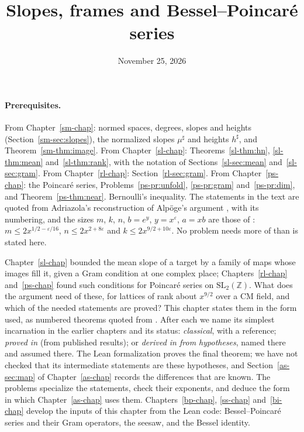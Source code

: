 \documentclass[reqno]{amsart}
\title{Slopes, frames and Bessel--Poincar\'e series}
\author{}
\date{November 25, 2026}
\newcounter{chap}
\theoremstyle{definition}
\theoremstyle{plain}
\newcommand{\Z}{\mathbb{Z}}
\begin{document}
\maketitle
{}\label{chap}

\paragraph{Prerequisites.}
From Chapter~\ref{sm-chap}: normed spaces, degrees, slopes and heights (Section~\ref{sm-sec:slopes}), the normalized slopes \(\mu^\sharp\) and heights \(h^\sharp\), and Theorem~\ref{sm-thm:image}.  From Chapter~\ref{sl-chap}: Theorems~\ref{sl-thm:hn}, \ref{sl-thm:mean} and~\ref{sl-thm:rank}, with the notation of Sections~\ref{sl-sec:mean} and~\ref{sl-sec:gram}.  From Chapter~\ref{rl-chap}: Section~\ref{rl-sec:gram}.  From Chapter~\ref{ps-chap}: the Poincar\'e series, Problems~\ref{ps-pr:unfold}, \ref{ps-pr:gram} and~\ref{ps-pr:dim}, and Theorem~\ref{ps-thm:near}.  Bernoulli's inequality.  The statements in the text are quoted from Adriazola's reconstruction \cite{Adr} of Alp\"oge's argument \cite{Alp}, with its numbering, and the sizes \(m\), \(k\), \(n\), \(b = e^y\), \(y = x^\varepsilon\), \(a = xb\) are those of \cite[Prop.~5.15]{Adr}: \(m \le 2x^{1/2-\varepsilon/16}\), \(n \le 2x^{2+8\varepsilon}\) and \(k \le 2x^{9/2+10\varepsilon}\).  No problem needs more of \cite{Adr} than is stated here.

\medskip
Chapter~\ref{sl-chap} bounded the mean slope of a target by a family of maps whose images fill it, given a Gram condition at one complex place; Chapters~\ref{rl-chap} and~\ref{ps-chap} found such conditions for Poincar\'e series on \(\mathrm{SL}_2(\Z)\).  What does the argument need of these, for lattices of rank about \(x^{9/2}\) over a CM field, and which of the needed statements are proved?  This chapter states them in the form used, as numbered theorems quoted from \cite{Adr}.  After each we name its simplest incarnation in the earlier chapters and its status: \emph{classical}, with a reference; \emph{proved in \cite{Adr}} (from published results); or \emph{derived in \cite{Adr} from hypotheses}, named there and assumed there.  The Lean formalization \cite{Lean} proves the final theorem; we have not checked that its intermediate statements are these hypotheses, and Section~\ref{as-sec:map} of Chapter~\ref{as-chap} records the differences that are known.  The problems specialize the statements, check their exponents, and deduce the form in which Chapter~\ref{as-chap} uses them.  Chapters~\ref{bp-chap}, \ref{ss-chap} and~\ref{bi-chap} develop the inputs of this chapter from the Lean code: Bessel--Poincar\'e series and their Gram operators, the seesaw, and the Bessel identity.
\end{document}
